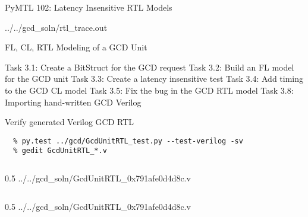 \begin{frame}{PyMTL 102: Latency Insensitive RTL Models}

\vspace{-0.15in}
%
{../../gcd_soln/rtl_trace.out}

\end{frame}


\begin{frame}{ FL, CL, RTL Modeling of a GCD Unit}
\begin{cbxlist}
  \1 Task 3.1: Create a BitStruct for the GCD request
  \1 Task 3.2: Build an FL model for the GCD unit
  \1 Task 3.3: Create a latency insensitive test
  \1 Task 3.4: Add timing to the GCD CL model
  \1 Task 3.5: Fix the bug in the GCD RTL model
  \1 
  \1 
  \1 Task 3.8: Importing hand-written GCD Verilog
\end{cbxlist}
\end{frame}

\begin{task}\begin{frame}[fragile]{Verify generated Verilog GCD RTL}

\vspace{-0.15in}
\begin{Verbatim}[commandchars=\\\{\}]
  % cd \midtilde/pymtl-tut/build
  % py.test ../gcd/GcdUnitRTL_test.py --test-verilog -sv
  % gedit GcdUnitRTL_*.v
\end{Verbatim}

\vspace{-0.1in}
\begin{cbxcols}
\begin{column}{0.5\tw}
%
{../../gcd_soln/GcdUnitRTL_0x791afe0d4d8c.v}
\end{column}
\begin{column}{0.5\tw}
%
{../../gcd_soln/GcdUnitRTL_0x791afe0d4d8c.v}
\end{column}
\end{cbxcols}

\end{frame}
\end{task}

